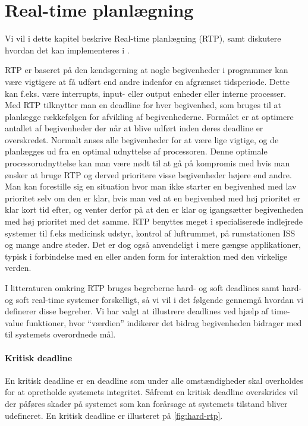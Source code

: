 \chapter{Real-time planlægning}
\label{chap:rtp}
Vi vil i dette kapitel beskrive Real-time planlægning (RTP), samt diskutere hvordan det kan implementeres i \pycsp. 

RTP er baseret på den kendsgerning at nogle begivenheder i programmer kan være vigtigere at få udført end andre indenfor en afgrænset tidsperiode. Dette kan f.eks. være interrupts, input- eller output enheder eller interne processer. Med RTP tilknytter man en deadline for hver begivenhed, som bruges til at planlægge rækkefølgen for afvikling af begivenhederne. Formålet er at optimere antallet af begivenheder der når at blive udført inden deres deadline er overskredet. Normalt anses alle begivenheder for at være lige vigtige, og de planlægges ud fra en optimal udnyttelse af processoren. Denne optimale processorudnyttelse kan man være nødt til at gå på kompromis med hvis man ønsker at bruge RTP og derved prioritere visse begivenheder højere end andre. Man kan forestille sig en situation hvor man ikke starter en begivenhed med lav prioritet selv om den er klar, hvis man ved at en begivenhed med høj prioritet er klar kort tid efter, og venter derfor på at den er klar og igangsætter begivenheden med høj prioritet med det samme. 
RTP benyttes meget i specialiserede indlejrede systemer til f.eks medicinsk udstyr, kontrol af luftrummet, på rumstationen ISS\cite{Audsley1990} og mange andre steder. Det er dog også anvendeligt i mere gængse applikationer, typisk i forbindelse med en eller anden form for interaktion med den virkelige verden. 

I litteraturen omkring RTP bruges begreberne hard- og soft deadlines samt hard- og soft real-time systemer forskelligt, så vi vil i det følgende gennemgå hvordan vi definerer disse begreber. Vi har valgt at illustrere deadlines ved hjælp af time-value funktioner, hvor ``værdien'' indikerer det bidrag begivenheden bidrager med til systemets overordnede mål. 

\subsubsection{Kritisk deadline}
En kritisk deadline er en deadline som under alle omstændigheder skal overholdes for at opretholde systemets integritet. Såfremt en kritisk deadline overskrides vil der påføres skader på systemet som kan forårsage at systemets tilstand bliver udefineret. En kritisk deadline er illusteret på \cref{fig:hard-rtp}.

